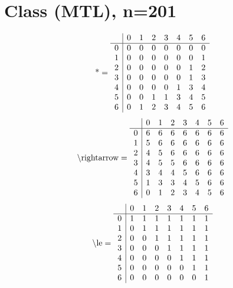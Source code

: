 \documentclass[11pt]{article}
\begin{document}
\section{Class (MTL), n=201}
\[\text{*} = 
\begin{array}{r | r r r r r r r}
 & 0 & 1 & 2 & 3 & 4 & 5 & 6 \\ \hline
0 & 0 & 0 & 0 & 0 & 0 & 0 & 0 \\
1 & 0 & 0 & 0 & 0 & 0 & 0 & 1 \\
2 & 0 & 0 & 0 & 0 & 0 & 1 & 2 \\
3 & 0 & 0 & 0 & 0 & 0 & 1 & 3 \\
4 & 0 & 0 & 0 & 0 & 1 & 3 & 4 \\
5 & 0 & 0 & 1 & 1 & 3 & 4 & 5 \\
6 & 0 & 1 & 2 & 3 & 4 & 5 & 6 \\
\end{array}
\]
\[\text{\textbackslash rightarrow} = 
\begin{array}{r | r r r r r r r}
 & 0 & 1 & 2 & 3 & 4 & 5 & 6 \\ \hline
0 & 6 & 6 & 6 & 6 & 6 & 6 & 6 \\
1 & 5 & 6 & 6 & 6 & 6 & 6 & 6 \\
2 & 4 & 5 & 6 & 6 & 6 & 6 & 6 \\
3 & 4 & 5 & 5 & 6 & 6 & 6 & 6 \\
4 & 3 & 4 & 4 & 5 & 6 & 6 & 6 \\
5 & 1 & 3 & 3 & 4 & 5 & 6 & 6 \\
6 & 0 & 1 & 2 & 3 & 4 & 5 & 6 \\
\end{array}
\]
\[\text{\textbackslash le} = 
\begin{array}{r | r r r r r r r}
 & 0 & 1 & 2 & 3 & 4 & 5 & 6 \\ \hline
0 & 1 & 1 & 1 & 1 & 1 & 1 & 1 \\
1 & 0 & 1 & 1 & 1 & 1 & 1 & 1 \\
2 & 0 & 0 & 1 & 1 & 1 & 1 & 1 \\
3 & 0 & 0 & 0 & 1 & 1 & 1 & 1 \\
4 & 0 & 0 & 0 & 0 & 1 & 1 & 1 \\
5 & 0 & 0 & 0 & 0 & 0 & 1 & 1 \\
6 & 0 & 0 & 0 & 0 & 0 & 0 & 1 \\
\end{array}
\]
\end{document}

